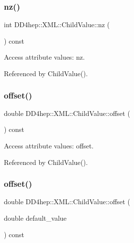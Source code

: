 \subsubsection{\texorpdfstring{nz()}{nz()}}
{\footnotesize\ttfamily int D\+D4hep\+::\+X\+M\+L\+::\+Child\+Value\+::nz (\begin{DoxyParamCaption}{ }\end{DoxyParamCaption}) const}



Access attribute values\+: nz. 



Referenced by Child\+Value().

\hypertarget{struct_d_d4hep_1_1_x_m_l_1_1_child_value_ae75624c6c08fb855e6ff9d62c5dbe87f}{}\label{struct_d_d4hep_1_1_x_m_l_1_1_child_value_ae75624c6c08fb855e6ff9d62c5dbe87f} 
\subsubsection{\texorpdfstring{offset()}{offset()}\hspace{0.1cm}{\footnotesize\ttfamily [1/2]}}
{\footnotesize\ttfamily double D\+D4hep\+::\+X\+M\+L\+::\+Child\+Value\+::offset (\begin{DoxyParamCaption}{ }\end{DoxyParamCaption}) const}



Access attribute values\+: offset. 



Referenced by Child\+Value().

\hypertarget{struct_d_d4hep_1_1_x_m_l_1_1_child_value_a0a5eed030060d7b7c5c9f524c24f66a5}{}\label{struct_d_d4hep_1_1_x_m_l_1_1_child_value_a0a5eed030060d7b7c5c9f524c24f66a5} 
\subsubsection{\texorpdfstring{offset()}{offset()}\hspace{0.1cm}{\footnotesize\ttfamily [2/2]}}
{\footnotesize\ttfamily double D\+D4hep\+::\+X\+M\+L\+::\+Child\+Value\+::offset (\begin{DoxyParamCaption}\item[{double}]{default\+\_\+value }\end{DoxyParamCaption}) const}



